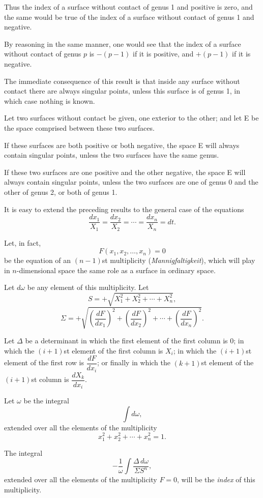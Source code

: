 \documentclass[11pt]{article}
\begin{document}
Thus the index of a surface without contact of genus 1 and positive is zero, and the same would be true of the index of a surface without contact of genus 1 and negative.

By reasoning in the same manner, one would see that the index of a surface without contact of genus $p$ is $-(p-1)$ if it is positive, and $+(p-1)$ if it is negative.

The immediate consequence of this result is that inside any surface without contact there are always singular points, unless this surface is of genus 1, in which case nothing is known.

Let two surfaces without contact be given, one exterior to the other; and let E be the space comprised between these two surfaces.

If these surfaces are both positive or both negative, the space E will always contain singular points, unless the two surfaces have the same genus.

If these two surfaces are one positive and the other negative, the space E will always contain singular points, unless the two surfaces are one of genus 0 and the other of genus 2, or both of genus 1.

It is easy to extend the preceding results to the general case of the equations
\[
\frac{dx_1}{X_1}=\frac{dx_2}{X_2}=\cdots=\frac{dx_n}{X_n}=dt.
\]

Let, in fact,
\[
F(x_1,x_2,\ldots,x_n)=0
\]
be the equation of an $(n-1)$st multiplicity (\emph{Mannigfaltigkeit}), which will play in $n$-dimensional space the same role as a surface in ordinary space.

Let $d\omega$ be any element of this multiplicity. Let
\[
S=+\sqrt{X_1^2+X_2^2+\cdots+X_n^2},
\]
\[
\Sigma=+\sqrt{\left(\frac{dF}{dx_1}\right)^2+\left(\frac{dF}{dx_2}\right)^2+\cdots+\left(\frac{dF}{dx_n}\right)^2}.
\]

Let $\Delta$ be a determinant in which the first element of the first column is 0; in which the $(i+1)$st element of the first column is $X_i$; in which the $(i+1)$st element of the first row is $\dfrac{dF}{dx_i}$; or finally in which the $(k+1)$st element of the $(i+1)$st column is $\dfrac{dX_k}{dx_i}$.

Let $\omega$ be the integral
\[
\int d\omega,
\]
extended over all the elements of the multiplicity
\[
x_1^2+x_2^2+\cdots+x_n^2=1.
\]

The integral
\[
-\frac1{\omega}\int\frac{\Delta\,d\omega}{\Sigma S^n},
\]
extended over all the elements of the multiplicity $F=0$, will be the \emph{index} of this multiplicity.
\end{document}
